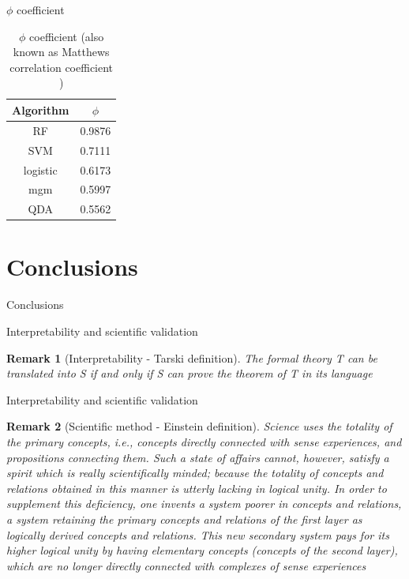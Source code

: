 \documentclass{beamer}
\newtheorem*{remark}{Remark}
\begin{document}
\begin{frame}{$\phi$ coefficient}
\begin{table}[]
\caption{$\phi$ coefficient (also known as Matthews correlation coefficient )}
\begin{center}
\begin{tabular}{c|c}
Algorithm & $\phi$ \\ \hline
RF        & 0.9876 \\ \hline
SVM       & 0.7111 \\ \hline
logistic  & 0.6173 \\ \hline
mgm       & 0.5997 \\ \hline
QDA       & 0.5562 
\end{tabular}
\end{center}
\label{phi_values}
\end{table}
\end{frame}

\section{Conclusions}

\begin{frame}{}
\begin{center}
{\Huge Conclusions}
\end{center}
\end{frame}

\begin{frame}{Interpretability and scientific validation}

\begin{remark}[Interpretability - Tarski definition]
The formal theory T can be translated into S if and only if S can prove the theorem of T in its language \cite{tarski1953undecidable}
\end{remark}

\end{frame}

\begin{frame}{Interpretability and scientific validation}

\begin{remark}[Scientific method - Einstein definition]
Science uses the totality of the primary concepts, i.e., concepts directly connected with sense experiences, and propositions connecting them. Such a state of affairs cannot, however, satisfy a spirit which is really scientifically minded; because the totality of concepts and relations obtained in this manner is utterly lacking in logical unity. In order to supplement this deficiency, one invents a system poorer in concepts and relations, a system retaining the primary concepts and relations of the \textit{first layer} as logically derived concepts and relations. This new \textit{secondary system} pays for its higher logical unity by having elementary concepts (concepts of the second layer), which are no longer directly connected with complexes of sense experiences \cite{physics-reality}
\end{remark}

\end{frame}
\end{document}
